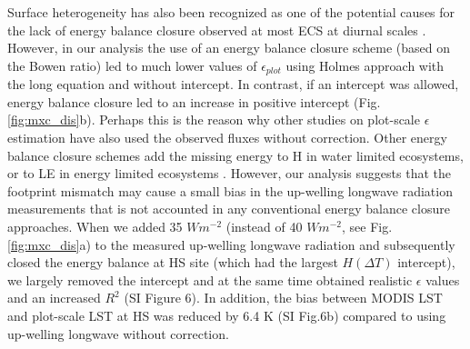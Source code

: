 \documentclass[fleqn,10pt]{wlscirep}
\begin{document}
Surface heterogeneity has also been recognized as one of the potential causes for the lack of energy balance closure observed at most ECS at diurnal scales \cite{wilson2002energy, stoy2013data}. However, in our analysis the use of an energy balance closure scheme (based on the Bowen ratio) led to much lower values of $\epsilon_{plot}$ using Holmes approach with the long equation and without intercept. In contrast, if an intercept was allowed, energy balance closure led to an increase in positive intercept (Fig. \ref{fig:mxc_dis}b). Perhaps this is the reason why other studies on plot-scale $\epsilon$ estimation have also used the observed fluxes without correction\cite{holmes2009land,holmes2016cloud,maes2019potential}. Other energy balance closure schemes add the missing energy to H in water limited ecosystems\cite{twine2000correcting}, or to LE in energy limited ecosystems \cite{chakraborty2019biases}. However, our analysis suggests that the footprint mismatch may cause a small bias in the up-welling longwave radiation measurements that is not accounted in any conventional energy balance closure approaches. When we added 35 $Wm^{-2}$ (instead of 40 $Wm^{-2}$, see Fig. \ref{fig:mxc_dis}a) to the measured up-welling longwave radiation and subsequently closed the energy balance at HS site (which had the largest $H(\Delta T)$ intercept), we largely removed the intercept and at the same time obtained realistic $\epsilon$ values and an increased $R^2$ (SI Figure 6). In addition, the bias between MODIS LST and plot-scale LST at HS was reduced by 6.4 K (SI Fig.6b) compared to using up-welling longwave without correction. 
 
\end{document}
